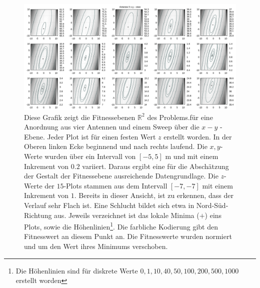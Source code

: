 %
\begin{figure}[h!]
  \caption[Fitness Ebenen Heatmap]{Diese Grafik zeigt die Fitnessebenen $\mathbb{R}^{2}$ des Problems.für eine Anordnung aus vier Antennen und einem Sweep über die $x-y$ - Ebene. Jeder Plot ist für einen festen Wert $z$ erstellt worden. In der Oberen linken Ecke beginnend und nach rechts laufend. Die $x, y$-Werte wurden über ein Intervall von $[-5,5]$ m und mit einem Inkrement von $0.2$ variiert. Daraus ergibt eine für die Abschätzung der Gestalt der Fitnessebene ausreichende Datengrundlage. Die $z$-Werte der $15$-Plots stammen aus dem Intervall $[-7,-7]$ mit einem Inkrement von $1$. Bereits in dieser Ansicht, ist zu erkennen, dass der Verlauf sehr Flach ist. Eine Schlucht bildet sich etwa in Nord-Süd-Richtung aus. Jeweils verzeichnet ist das lokale Minima ($+$) eins Plots, sowie die Höhenlinien\footnote{Die Höhenlinien sind für diskrete Werte ${0,1,10,40,50,100,200,500,1000}$ erstellt worden}. Die farbliche Kodierung gibt den Fitnesswert an diesem Punkt an. Die Fitnesswerte wurden normiert und um den Wert ihres Minimums verschoben.}
  \begin{center}
    \includegraphics[width=\textwidth]{img/fitness/xy_a0.png}
  \end{center}
  \label{fig:fitnessplane1-x-y-1}
%
\end{figure}


